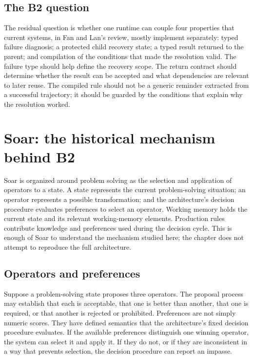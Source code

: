 \subsection{The B2 question}

The residual question is whether one runtime can couple four properties that current systems, in Fan and Lan's review, mostly implement separately: typed failure diagnosis; a protected child recovery state; a typed result returned to the parent; and compilation of the conditions that made the resolution valid. The failure type should help define the recovery scope. The return contract should determine whether the result can be accepted and what dependencies are relevant to later reuse. The compiled rule should not be a generic reminder extracted from a successful trajectory; it should be guarded by the conditions that explain why the resolution worked.


\section{Soar: the historical mechanism behind B2}
\label{sec:ch13-soar}

Soar is organized around problem solving as the selection and application of operators to a state. A state represents the current problem-solving situation; an \gls{operator} represents a possible transformation; and the architecture's decision procedure evaluates \glspl{preference} to select an operator. Working memory holds the current state and its relevant working-memory elements. Production rules contribute knowledge and preferences used during the decision cycle. This is enough of Soar to understand the mechanism studied here; the chapter does not attempt to reproduce the full architecture.\autocite{soar2025architecture}

\subsection{Operators and preferences}

Suppose a problem-solving state proposes three operators. The proposal process may establish that each is acceptable, that one is better than another, that one is required, or that another is rejected or prohibited. Preferences are not simply numeric scores. They have defined semantics that the architecture's fixed decision procedure evaluates. If the available preferences distinguish one winning operator, the system can select it and apply it. If they do not, or if they are inconsistent in a way that prevents selection, the decision procedure can report an impasse.

